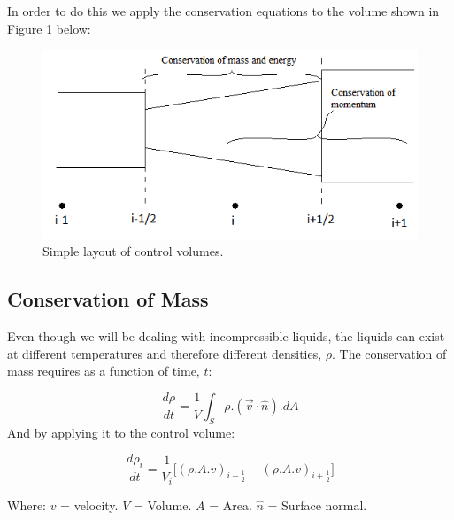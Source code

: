 \documentclass[11pt,letterpaper,titlepage]{article}
\newcommand{\half}{\frac{1}{2}}
\begin{document}
\vspace{0.25cm}
\noindent
In order to do this we apply the conservation equations to the volume shown in Figure \ref{figure:ZZZ_ControlVolume} below:
	\begin{center}
		\begin{minipage}[c]{0.7\textwidth}
	
			\begin{figure}[H]
			
				\includegraphics[width=5in]{ZZZ_ControlVolume.png}
				\caption{Simple layout of control volumes.}
				\label{figure:ZZZ_ControlVolume}
			\end{figure}
		\end{minipage}
	\end{center}
\vspace{0.5cm}

\newpage
\subsection{Conservation of Mass}
Even though we will be dealing with incompressible liquids, the liquids can exist at different temperatures and therefore different densities, $\rho$. The conservation of mass requires as a function of time, $t$:

\begin{equation*}
\frac{d\rho}{dt}=\frac{1}{V}\int_S \rho.(\vec{v}\cdot \hat{n}).dA
\end{equation*}
\newline
\noindent And by applying it to the control volume:

\begin{equation}
\frac{d\rho_i}{dt} = \frac{1}{V_i}\biggr[ (\rho.A.v)_{i-\half}-(\rho.A.v)_{i+\half} \biggr]
\end{equation}

\noindent 
Where: 
\newline \noindent $v$ \quad = velocity.
\newline \noindent $V$ \quad = Volume.
\newline \noindent $A$ \quad = Area.
\newline \noindent $\hat{n}$ \quad = Surface normal.
\end{document}
